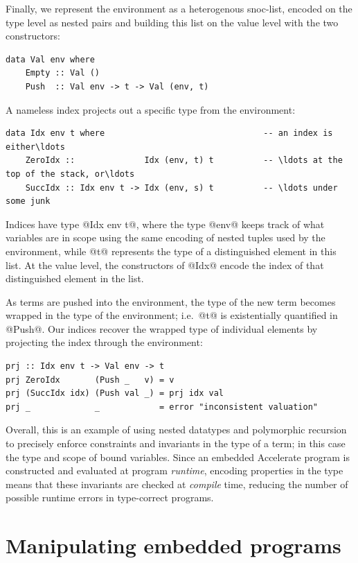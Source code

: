 Finally, we represent the environment as a heterogenous snoc-list, encoded on
the type level as nested pairs and building this list on the value level with
the two constructors:
%
\begin{lstlisting}[style=haskell]
data Val env where
    Empty :: Val ()
    Push  :: Val env -> t -> Val (env, t)
\end{lstlisting}
%
A nameless  index projects out a specific type from the
environment:
%
\begin{lstlisting}[style=haskell]
data Idx env t where                                -- an index is either\ldots
    ZeroIdx ::              Idx (env, t) t          -- \ldots at the top of the stack, or\ldots
    SuccIdx :: Idx env t -> Idx (env, s) t          -- \ldots under some junk
\end{lstlisting}
%
Indices have type @Idx env t@, where the type @env@ keeps track of what
variables are in scope using the same encoding of nested tuples used by the
environment, while @t@ represents the type of a distinguished element in this
list. At the value level, the constructors of @Idx@ encode the index of that
distinguished element in the list.

As terms are pushed into the environment, the type of the new term becomes
wrapped in the type of the environment; i.e.\ @t@ is existentially quantified in
@Push@. Our  indices recover the wrapped type of individual
elements by projecting the index through the environment:
%
\begin{lstlisting}[style=haskell]
prj :: Idx env t -> Val env -> t
prj ZeroIdx       (Push _   v) = v
prj (SuccIdx idx) (Push val _) = prj idx val
prj _             _            = error "inconsistent valuation"
\end{lstlisting}

Overall, this is an example of using nested datatypes and polymorphic recursion
to precisely enforce constraints and invariants in the type of a term; in this
case the type and scope of bound variables. Since an embedded Accelerate program is
constructed and evaluated at program \emph{runtime}, encoding properties in the
type means that these invariants are checked at \emph{compile} time, reducing
the number of possible runtime errors in type-correct programs.


\section{Manipulating embedded programs}
\label{sec:manipulating_embedded_programs}

